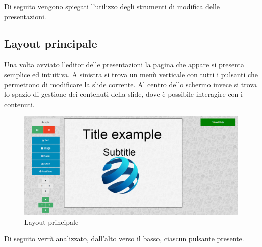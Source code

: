 Di seguito vengono spiegati l'utilizzo degli strumenti di modifica delle presentazioni.

\subsection{Layout principale}
Una volta avviato l'editor delle presentazioni la pagina che appare si presenta semplice ed intuitiva. A sinistra si trova un menù verticale con tutti i pulsanti che permettono di modificare la slide corrente. Al centro dello schermo invece si trova lo spazio di gestione dei contenuti della slide, dove è possibile interagire con i contenuti.

\begin{figure}[H] 
	\centering 
	\includegraphics[scale=0.40] {img/layout_editor.png}
	\caption{Layout principale} 
\end{figure}

Di seguito verrà analizzato, dall'alto verso il basso, ciascun pulsante presente.

